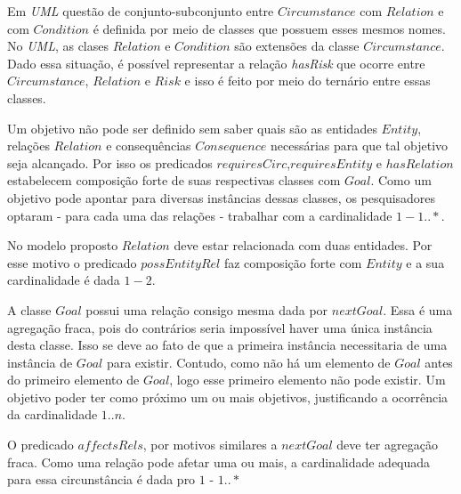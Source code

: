 Em \textit{UML} questão de conjunto-subconjunto entre $Circumstance$ com $Relation$ e com $Condition$ é definida por meio de classes que possuem esses mesmos nomes. No \textit{UML}, as clases $Relation$ e $Condition$ são extensões da classe $Circumstance$. Dado essa situação, é possível representar a relação \textit{hasRisk} que ocorre entre $Circumstance$, $Relation$ e $Risk$ e isso é feito por meio do ternário entre essas classes. 

Um objetivo não pode ser definido sem saber quais são as entidades $Entity$, relações $Relation$ e consequências $Consequence$ necessárias para que tal objetivo seja alcançado. Por isso os predicados $requiresCirc$,$requiresEntity$ e $hasRelation$ estabelecem composição forte de suas respectivas classes com $Goal$. Como um objetivo pode apontar para diversas instâncias dessas classes, os pesquisadores optaram - para cada uma das relações - trabalhar com a cardinalidade 
$1 - 1 .. *$.

No modelo proposto $Relation$ deve estar relacionada com duas entidades. Por esse motivo o predicado $possEntityRel$ faz composição forte com $Entity$ e a sua cardinalidade é dada $1 - 2$. 

A classe $Goal$ possui uma relação consigo mesma dada por $nextGoal$. Essa é uma agregação fraca, pois do contrários seria impossível haver uma única instância desta classe. Isso se deve ao fato de que a primeira instância necessitaria de uma instância de $Goal$ para existir. Contudo, como não há um elemento de $Goal$ antes do primeiro elemento de $Goal$, logo esse primeiro elemento não pode existir. Um objetivo poder ter como próximo um ou mais objetivos, justificando a ocorrência da cardinalidade $1 .. n$. 

O predicado $affectsRels$, por motivos similares a $nextGoal$ deve ter agregação fraca. Como uma relação pode afetar uma ou mais, a cardinalidade adequada para essa circunstância é dada pro $1$ - $1 ..*$